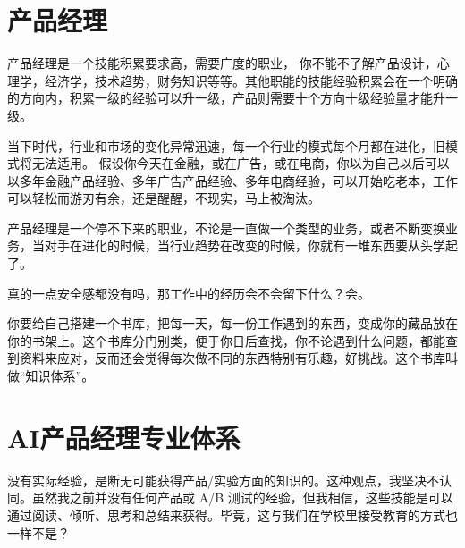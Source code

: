 \documentclass[letterpaper,10pt,english]{sphinxmanual}
\begin{document}
\chapter{产品经理}
\label{\detokenize{index:id1}}
产品经理是一个技能积累要求高，需要广度的职业，
你不能不了解产品设计，心理学，经济学，技术趋势，财务知识等等。其他职能的技能经验积累会在一个明确的方向内，积累一级的经验可以升一级，产品则需要十个方向十级经验量才能升一级。
%
\begin{footnote}[3]\sphinxAtStartFootnote
{}
%
\end{footnote}

当下时代，行业和市场的变化异常迅速，每一个行业的模式每个月都在进化，旧模式将无法适用。
假设你今天在金融，或在广告，或在电商，你以为自己以后可以以多年金融产品经验、多年广告产品经验、多年电商经验，可以开始吃老本，工作可以轻松而游刃有余，还是醒醒，不现实，马上被淘汰。

产品经理是一个停不下来的职业，不论是一直做一个类型的业务，或者不断变换业务，当对手在进化的时候，当行业趋势在改变的时候，你就有一堆东西要从头学起了。

真的一点安全感都没有吗，那工作中的经历会不会留下什么？会。

你要给自己搭建一个书库，把每一天，每一份工作遇到的东西，变成你的藏品放在你的书架上。这个书库分门别类，便于你日后查找，你不论遇到什么问题，都能查到资料来应对，反而还会觉得每次做不同的东西特别有乐趣，好挑战。这个书库叫做“知识体系”。



\chapter{AI产品经理专业体系}
\label{\detokenize{index:ai}}
没有实际经验，是断无可能获得产品/实验方面的知识的。这种观点，我坚决不认同。虽然我之前并没有任何产品或
A/B
测试的经验，但我相信，这些技能是可以通过阅读、倾听、思考和总结来获得。毕竟，这与我们在学校里接受教育的方式也一样不是？%
\begin{footnote}[4]\sphinxAtStartFootnote
{}
%
\end{footnote}
\end{document}
